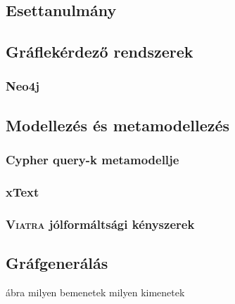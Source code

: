 \chapter{\eloismeretek}

\section{Esettanulmány}

\section{Gráflekérdező rendszerek}
\subsection{Neo4j}


\section{Modellezés és metamodellezés}
\subsection{Cypher query-k metamodellje}
\subsection{xText}
\subsection{\textsc{Viatra} jólformáltsági kényszerek}

\section{Gráfgenerálás}

ábra milyen bemenetek milyen kimenetek





